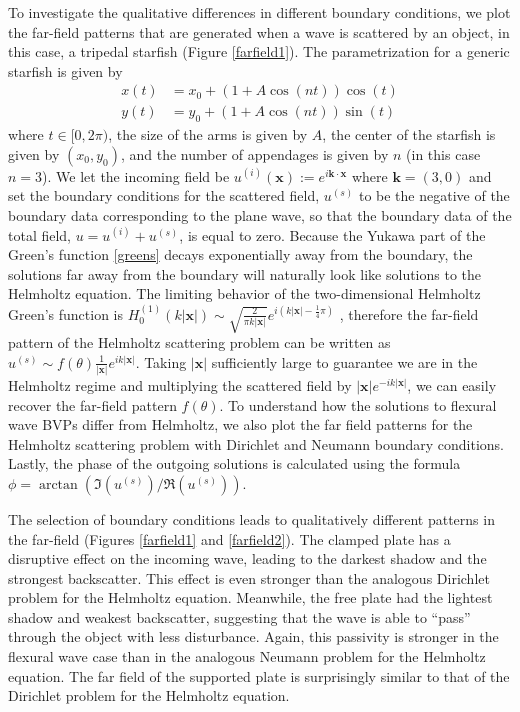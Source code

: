 \documentclass[preprint,12pt,3p]{elsarticle}
\begin{document}
To investigate the qualitative differences in different boundary conditions, we plot the far-field patterns that are generated when a wave is scattered by an object, in this case, a tripedal starfish (Figure \ref{farfield1}). The parametrization for a generic starfish is given by
\begin{align}
    x(t) &= x_0 + (1+ A \cos(n t)) \cos(t) \\
    y(t) &= y_0 + (1+ A \cos(n t)) \sin(t)
\end{align}
where $t \in [0, 2\pi)$, the size of the arms is given by $A$, the center of the starfish is given by $(x_0, y_0)$, and the number of appendages is given by $n$ (in this case $n= 3$). We let the incoming field be $u^{(i)}(\mathbf{x}) := e^{i \mathbf{k} \cdot \mathbf{x}}$ where $\mathbf{k} = (3, 0)$ and set the boundary conditions for the scattered field, $u^{(s)}$ to be the negative of the boundary data corresponding to the plane wave, so that the boundary data of the total field, $u=u^{(i)}+u^{(s)}$, is equal to zero. Because the Yukawa part of the Green's function \eqref{greens} decays exponentially away from the boundary, the solutions far away from the boundary will naturally look like solutions to the Helmholtz equation. The limiting behavior of the two-dimensional Helmholtz Green's function is $H_0^{(1)}(k|\mathbf{x}|) \sim \sqrt{\frac{2}{\pi k |\mathbf{x} | }} e^{i ( k |\mathbf{x} | - \frac{1}{4} \pi )} $ \cite{NIST}, therefore the far-field pattern of the Helmholtz scattering problem can be written as $u^{(s)} \sim  f(\theta) \frac{1}{ | \mathbf{x} | } e^{ i k | \mathbf{x} | } $. Taking $|\mathbf{x}|$ sufficiently large to guarantee we are in the Helmholtz regime and multiplying the scattered field by $|\mathbf{x} | e^{- i k | \mathbf{x} |}$, we can easily recover the far-field pattern $f(\theta)$. To understand how the solutions to flexural wave BVPs differ from Helmholtz, we also plot the far field patterns for the Helmholtz scattering problem with Dirichlet and Neumann boundary conditions. Lastly, the phase of the outgoing solutions is calculated using the formula $\phi = \arctan \left( \Im(u^{(s)}) / \Re(u^{(s)}) \right)$.






The selection of boundary conditions leads to qualitatively different patterns in the far-field (Figures \ref{farfield1} and \ref{farfield2}). The clamped plate has a disruptive effect on the incoming wave, leading to the darkest shadow and the strongest backscatter. This effect is even stronger than the analogous Dirichlet problem for the Helmholtz equation. Meanwhile, the free plate had the lightest shadow and weakest backscatter, suggesting that the wave is able to ``pass'' through the object with less disturbance. Again, this passivity is stronger in the flexural wave case than in the analogous Neumann problem for the Helmholtz equation. The far field of the supported plate is surprisingly similar to that of the Dirichlet problem for the Helmholtz equation. 
\end{document}
